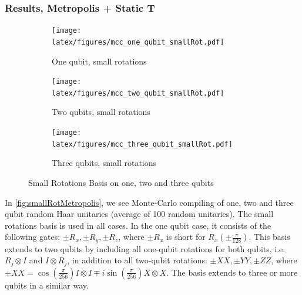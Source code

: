 \documentclass{article}
\begin{document}
\subsubsection*{Results, Metropolis + Static T}
\begin{figure}[H]

\begin{subfigure}{.5\textwidth} 
    \centering
    \texttt{[image: latex/figures/mcc\_one\_qubit\_smallRot.pdf]}  %
    \caption{One qubit, small rotations}
    \label{fig:sub-first}
\end{subfigure}
\begin{subfigure}{.5\textwidth}
    \centering
    \texttt{[image: latex/figures/mcc\_two\_qubit\_smallRot.pdf]}  
    \caption{Two qubits, small rotations}
    \label{fig:sub-second}
\end{subfigure}


\begin{subfigure}{\textwidth}
    \centering
    \texttt{[image: latex/figures/mcc\_three\_qubit\_smallRot.pdf]}   %
    \caption{Three qubits, small rotations}
    \label{fig:sub-firstA}
\end{subfigure}
\caption{Small Rotations Basis on one, two and three qubits}\label{fig:smallRotMetropolis}
\end{figure}

In \autoref{fig:smallRotMetropolis}, we see Monte-Carlo compiling of one, two and three qubit random Haar unitaries (average of 100 random unitaries). The small rotations basis is used in all cases. In the one qubit case, it consists of the following gates: $\pm R_x, \pm R_y, \pm R_z$, where $\pm R_x$ is short for $R_x(\pm \frac{\pi}{128})$. This basis extends to two qubits by including all one-qubit rotations for both qubits, i.e. $R_j\otimes I$ and $I\otimes R_j$, in addition to all two-qubit rotations: $\pm XX, \pm YY, \pm ZZ$, where $\pm XX = \cos(\frac{\pi}{256})I\otimes I \mp i \sin(\frac{\pi}{256})X \otimes X$. The basis extends to three or more qubits in a similar way.\\
\end{document}
